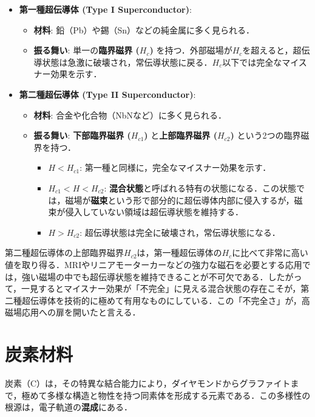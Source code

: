 \documentclass[11pt,a4paper]{ltjsarticle}
\newcommand{\supcite}[1]{\textsuperscript{\cite{#1}}}
\begin{document}
\begin{itemize}
\item \textbf{第一種超伝導体 (Type I Superconductor)}:
  \begin{itemize}
  \item \textbf{材料}: 鉛（Pb）や錫（Sn）などの純金属に多く見られる．
  \item \textbf{振る舞い}: 単一の\textbf{臨界磁界 ($H_c$)} を持つ．外部磁場が$H_c$を超えると，超伝導状態は急激に破壊され，常伝導状態に戻る．$H_c$以下では完全なマイスナー効果を示す\supcite{ref1}．
  \end{itemize}

\item \textbf{第二種超伝導体 (Type II Superconductor)}:
  \begin{itemize}
  \item \textbf{材料}: 合金や化合物（NbNなど）に多く見られる．
  \item \textbf{振る舞い}: \textbf{下部臨界磁界 ($H_{c1}$)} と\textbf{上部臨界磁界 ($H_{c2}$)} という2つの臨界磁界を持つ．
    \begin{itemize}
    \item $H<H_{c1}$: 第一種と同様に，完全なマイスナー効果を示す．
    \item $H_{c1}<H<H_{c2}$: \textbf{混合状態}と呼ばれる特有の状態になる．この状態では，磁場が\textbf{磁束}という形で部分的に超伝導体内部に侵入するが，磁束が侵入していない領域は超伝導状態を維持する\supcite{ref1}．
    \item $H>H_{c2}$: 超伝導状態は完全に破壊され，常伝導状態になる．
    \end{itemize}
  \end{itemize}
\end{itemize}

第二種超伝導体の上部臨界磁界$H_{c2}$は，第一種超伝導体の$H_c$に比べて非常に高い値を取り得る．MRIやリニアモーターカーなどの強力な磁石を必要とする応用では，強い磁場の中でも超伝導状態を維持できることが不可欠である．したがって，一見するとマイスナー効果が「不完全」に見える混合状態の存在こそが，第二種超伝導体を技術的に極めて有用なものにしている．この「不完全さ」が，高磁場応用への扉を開いたと言える．

\section{炭素材料}

炭素（C）は，その特異な結合能力により，ダイヤモンドからグラファイトまで，極めて多様な構造と物性を持つ同素体を形成する元素である．この多様性の根源は，電子軌道の\textbf{混成}にある\supcite{ref1}．
\end{document}
